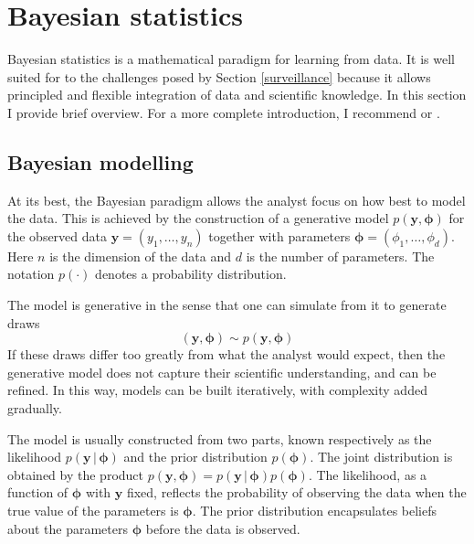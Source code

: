 \documentclass[a4paper, nobind]{templates/ociamthesis}
\begin{document}
\adjustmtc
{}

\hypertarget{bayesian-statistics}{%
\section{Bayesian statistics}\label{bayesian-statistics}}

Bayesian statistics is a mathematical paradigm for learning from data.
It is well suited for to the challenges posed by Section \ref{surveillance} because it allows principled and flexible integration of data and scientific knowledge.
In this section I provide brief overview.
For a more complete introduction, I recommend \textcite{mcelreath2020statistical} or \textcite{gelman2013bayesian}.

\hypertarget{bayesian-modelling}{%
\subsection{Bayesian modelling}\label{bayesian-modelling}}

At its best, the Bayesian paradigm allows the analyst focus on how best to model the data.
This is achieved by the construction of a generative model \(p(\mathbf{y}, \boldsymbol{\mathbf{\phi}})\) for the observed data \(\mathbf{y} = (y_1, \ldots, y_n)\) together with parameters \(\boldsymbol{\mathbf{\phi}} = (\phi_1, \ldots, \phi_d)\).
Here \(n\) is the dimension of the data and \(d\) is the number of parameters.
The notation \(p(\cdot)\) denotes a probability distribution.

The model is generative in the sense that one can simulate from it to generate draws
\begin{equation}
(\mathbf{y}, \boldsymbol{\mathbf{\phi}}) \sim p(\mathbf{y}, \boldsymbol{\mathbf{\phi}})
\end{equation}
If these draws differ too greatly from what the analyst would expect, then the generative model does not capture their scientific understanding, and can be refined.
In this way, models can be built iteratively, with complexity added gradually.

The model is usually constructed from two parts, known respectively as the likelihood \(p(\mathbf{y} \, | \, \boldsymbol{\mathbf{\phi}})\) and the prior distribution \(p(\boldsymbol{\mathbf{\phi}})\).
The joint distribution is obtained by the product \(p(\mathbf{y}, \boldsymbol{\mathbf{\phi}}) = p(\mathbf{y} \, | \, \boldsymbol{\mathbf{\phi}}) p(\boldsymbol{\mathbf{\phi}})\).
The likelihood, as a function of \(\boldsymbol{\mathbf{\phi}}\) with \(\mathbf{y}\) fixed, reflects the probability of observing the data when the true value of the parameters is \(\boldsymbol{\mathbf{\phi}}\).
The prior distribution encapsulates beliefs about the parameters \(\boldsymbol{\mathbf{\phi}}\) before the data is observed.
\end{document}
